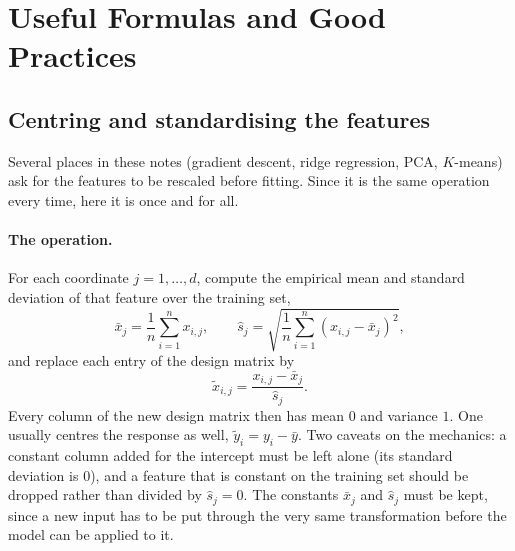 \section{Useful Formulas and Good Practices}

\subsection{Centring and standardising the features}
\label{subsec:standardise}

Several places in these notes (gradient descent, ridge regression, PCA, $K$-means) ask
for the features to be rescaled before fitting. Since it is the same operation every
time, here it is once and for all.

\paragraph{The operation.}
For each coordinate $j = 1, \dots, d$, compute the empirical mean and standard
deviation of that feature over the training set,
\[
\bar x_j = \frac{1}{n} \sum_{i=1}^n x_{i,j} ,
\qquad
\hat s_j = \sqrt{ \frac{1}{n} \sum_{i=1}^n (x_{i,j} - \bar x_j)^2 } ,
\]
and replace each entry of the design matrix by
\[
\tilde x_{i,j} = \frac{x_{i,j} - \bar x_j}{\hat s_j} .
\]
Every column of the new design matrix then has mean $0$ and variance $1$. One usually
centres the response as well, $\tilde y_i = y_i - \bar y$. Two caveats on the
mechanics: a constant column added for the intercept must be left alone (its standard
deviation is $0$), and a feature that is constant on the training set should be dropped
rather than divided by $\hat s_j = 0$. The constants $\bar x_j$ and $\hat s_j$ must be
kept, since a new input has to be put through the very same transformation before the
model can be applied to it.

